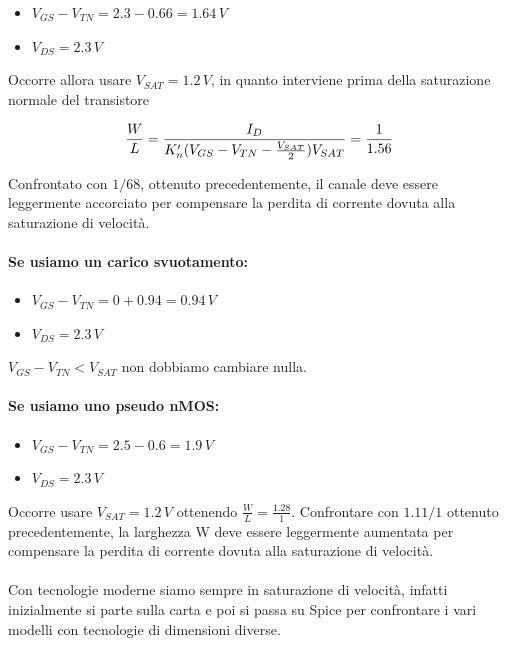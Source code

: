 \begin{itemize}
    \item[] $V_{GS} - V_{TN} = 2.3 - 0.66 = 1.64\,V$
    \item[] $V_{DS} = 2.3\, V$
\end{itemize}

Occorre allora usare $V_{SAT} = 1.2 \,V$, in quanto interviene prima della saturazione normale del transistore

\begin{equation*}
    \frac{W}{L} = \frac{I_D}{K_n'(V_{GS} - V_{TN} - \frac{V_{SAT}}{2})V_{SAT}} = \frac{1}{1.56}
\end{equation*}

Confrontato con $1/68$, ottenuto	precedentemente, il	canale	deve	essere	leggermente	accorciato	per	compensare	la	perdita	
di	corrente	dovuta	alla	saturazione	di	velocità.



\paragraph{Se usiamo un carico svuotamento:}


\begin{itemize}
    \item[] $V_{GS} - V_{TN} = 0+0.94 =0.94\,V$
    \item[] $V_{DS} = 2.3 \,V$
\end{itemize}

$V_{GS} - V_{TN} < V_{SAT}$ non dobbiamo cambiare nulla.

\paragraph{Se usiamo uno pseudo nMOS:}



\begin{itemize}
    \item[] $V_{GS} - V_{TN} = 2.5 - 0.6 = 1.9\,V$
    \item[] $V_{DS} = 2.3\, V$
\end{itemize}

Occorre usare $V_{SAT} = 1.2 \,V$ ottenendo $\frac{W}{L} = \frac{1.28}{1}$. Confrontare	con	$1.11/1$	ottenuto	precedentemente, la larghezza	W	deve	essere	leggermente	aumentata	per	compensare	la	perdita	di	corrente	dovuta	alla	saturazione	di	velocità.


\paragraph{}
Con tecnologie moderne siamo sempre in saturazione di velocità, infatti inizialmente si parte sulla carta e poi si passa su Spice per confrontare i vari modelli con tecnologie di dimensioni diverse.

